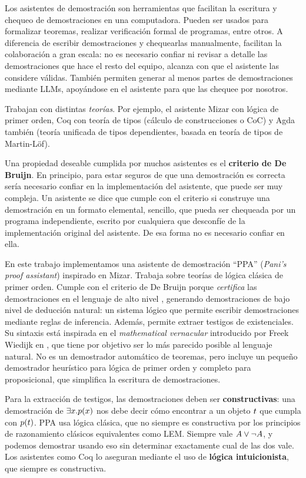 Los asistentes de demostración son herramientas que facilitan la escritura y chequeo de demostraciones en una computadora. Pueden ser usados para formalizar teoremas, realizar verificación formal de programas, entre otros. A diferencia de escribir demostraciones y chequearlas manualmente, facilitan la colaboración a gran escala: no es necesario confiar ni revisar a detalle las demostraciones que hace el resto del equipo, alcanza con que el asistente las considere válidas. También permiten generar al menos partes de demostraciones mediante LLMs, apoyándose en el asistente para que las chequee por nosotros.

Trabajan con distintas \textit{teorías}. Por ejemplo, el asistente Mizar con lógica de primer orden, Coq con teoría de tipos (cálculo de construcciones o CoC) y Agda también (teoría unificada de tipos dependientes, basada en teoría de tipos de Martin-Löf).

Una propiedad deseable cumplida por muchos asistentes es el \textbf{criterio de De Bruijn}. En principio, para estar seguros de que una demostración es correcta sería necesario confiar en la implementación del asistente, que puede ser muy compleja. Un asistente se dice que cumple con el criterio si construye una demostración en un formato elemental, sencillo, que pueda ser chequeada por un programa independiente, escrito por cualquiera que desconfíe de la implementación original del asistente. De esa forma no es necesario confiar en ella.

En este trabajo implementamos una asistente de demostración ``PPA''
(\textit{Pani's proof assistant}) inspirado en Mizar. Trabaja sobre teorías de
lógica clásica de primer orden. Cumple con el criterio de De Bruijn porque
\textit{certifica} las demostraciones en el lenguaje de alto nivel \ppaLang{},
generando demostraciones de bajo nivel de deducción natural: un sistema lógico
que permite escribir demostraciones mediante reglas de inferencia. Además,
permite extraer testigos de existenciales. Su sintaxis está inspirada en el
\textit{mathematical vernacular} introducido por Freek Wiedijk en
\cite{freek-mv}, que tiene por objetivo ser lo más parecido posible al lenguaje
natural. No es un demostrador automático de teoremas, pero incluye un pequeño demostrador heurístico para lógica de primer orden y completo para proposicional, que simplifica la escritura de demostraciones.

Para la extracción de testigos, las demostraciones deben ser \textbf{constructivas}: una demostración de $\exists x . p(x)$ nos debe decir cómo encontrar a un objeto $t$ que cumpla con $p(t)$. PPA usa lógica clásica, que no siempre es constructiva por los principios de razonamiento clásicos equivalentes como LEM. Siempre vale $A \vee \neg A$, y podemos demostrar usando eso sin determinar exactamente cual de las dos vale. Los asistentes como Coq lo aseguran mediante el uso de \textbf{lógica intuicionista}, que siempre es constructiva.

